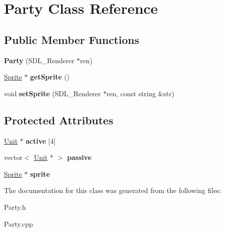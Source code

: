 \hypertarget{class_party}{}\section{Party Class Reference}
\label{class_party}
\subsection*{Public Member Functions}
\begin{DoxyCompactItemize}
\item 
{\bfseries Party} (S\+D\+L\+\_\+\+Renderer $\ast$ren)\hypertarget{class_party_a950ef19c74b4ff434064d909145b4190}{}\label{class_party_a950ef19c74b4ff434064d909145b4190}

\item 
\hyperlink{class_sprite}{Sprite} $\ast$ {\bfseries get\+Sprite} ()\hypertarget{class_party_a79d7e55a83b66a41146679deb3b4c533}{}\label{class_party_a79d7e55a83b66a41146679deb3b4c533}

\item 
void {\bfseries set\+Sprite} (S\+D\+L\+\_\+\+Renderer $\ast$ren, const string \&str)\hypertarget{class_party_abe069ffbbf3352f6b39246c8382dd26b}{}\label{class_party_abe069ffbbf3352f6b39246c8382dd26b}

\end{DoxyCompactItemize}
\subsection*{Protected Attributes}
\begin{DoxyCompactItemize}
\item 
\hyperlink{class_unit}{Unit} $\ast$ {\bfseries active} \mbox{[}4\mbox{]}\hypertarget{class_party_aca0245ec21a99d76c4f1d00b7299629a}{}\label{class_party_aca0245ec21a99d76c4f1d00b7299629a}

\item 
vector$<$ \hyperlink{class_unit}{Unit} $\ast$ $>$ {\bfseries passive}\hypertarget{class_party_ab1e00e761df6f415ed72a920d4aa9ec6}{}\label{class_party_ab1e00e761df6f415ed72a920d4aa9ec6}

\item 
\hyperlink{class_sprite}{Sprite} $\ast$ {\bfseries sprite}\hypertarget{class_party_ae71ba8a78bc7da8b16ff861412b30adb}{}\label{class_party_ae71ba8a78bc7da8b16ff861412b30adb}

\end{DoxyCompactItemize}


The documentation for this class was generated from the following files\+:\begin{DoxyCompactItemize}
\item 
Party.\+h\item 
Party.\+cpp\end{DoxyCompactItemize}
